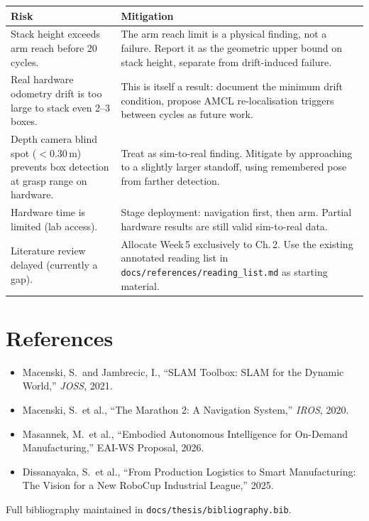 \documentclass[11pt,a4paper]{article}
\begin{document}
\begin{table}[h]
\centering
\small
\begin{tabularx}{\textwidth}{X X}
\toprule
\textbf{Risk} & \textbf{Mitigation} \\
\midrule
Stack height exceeds arm reach before 20 cycles.
& The arm reach limit is a physical finding, not a failure. Report it as the
  geometric upper bound on stack height, separate from drift-induced failure. \\
\addlinespace
Real hardware odometry drift is too large to stack even 2--3 boxes.
& This is itself a result: document the minimum drift condition, propose AMCL
  re-localisation triggers between cycles as future work. \\
\addlinespace
Depth camera blind spot ($<$0.30\,m) prevents box detection at grasp range on hardware.
& Treat as sim-to-real finding. Mitigate by approaching to a slightly larger
  standoff, using remembered pose from farther detection. \\
\addlinespace
Hardware time is limited (lab access).
& Stage deployment: navigation first, then arm. Partial hardware results are
  still valid sim-to-real data. \\
\addlinespace
Literature review delayed (currently a gap).
& Allocate Week\,5 exclusively to Ch.\,2. Use the existing annotated reading list
  in \texttt{docs/references/reading\_list.md} as starting material. \\
\bottomrule
\end{tabularx}
\end{table}

\vspace{0.5em}

\section{References}

\begin{itemize}[label=\textbullet, leftmargin=1.5em]
    \item Macenski, S.\ and Jambrecic, I., ``SLAM Toolbox: SLAM for the Dynamic
    World,'' \textit{JOSS}, 2021.
    \item Macenski, S.\ et al., ``The Marathon 2: A Navigation System,'' \textit{IROS},
    2020.
    \item Masannek, M.\ et al., ``Embodied Autonomous Intelligence for On-Demand
    Manufacturing,'' EAI-WS Proposal, 2026.
    \item Dissanayaka, S.\ et al., ``From Production Logistics to Smart Manufacturing:
    The Vision for a New RoboCup Industrial League,'' 2025.
\end{itemize}

\noindent
Full bibliography maintained in \texttt{docs/thesis/bibliography.bib}.
\end{document}
